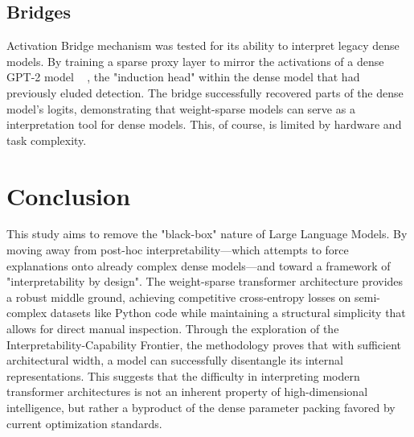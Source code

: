 \documentclass[a4paper,oneside,10pt,english]{scrartcl}
\begin{document}
\subsection{Bridges}

Activation Bridge mechanism was tested for its ability to interpret legacy dense models. By training a sparse proxy layer to mirror the activations of a dense GPT-2 model ~\cite{radford2019language} , the "induction head" within the dense model that had previously eluded detection. The bridge successfully recovered parts of the dense model’s logits, demonstrating that weight-sparse models can serve as a interpretation tool for dense models. This, of course, is limited by hardware and task complexity. 




\section{Conclusion}
\label{sec:conclusion}

This study aims to remove the "black-box" nature of Large Language Models. By moving away from post-hoc interpretability—which attempts to force explanations onto already complex dense models—and toward a framework of "interpretability by design". The weight-sparse transformer architecture provides a robust middle ground, achieving competitive cross-entropy losses on semi-complex datasets like Python code while maintaining a structural simplicity that allows for direct manual inspection. Through the exploration of the Interpretability-Capability Frontier, the methodology proves that with sufficient architectural width, a model can successfully disentangle its internal representations. This suggests that the difficulty in interpreting modern transformer architectures is not an inherent property of high-dimensional intelligence, but rather a byproduct of the dense parameter packing favored by current optimization standards. \par
\end{document}
